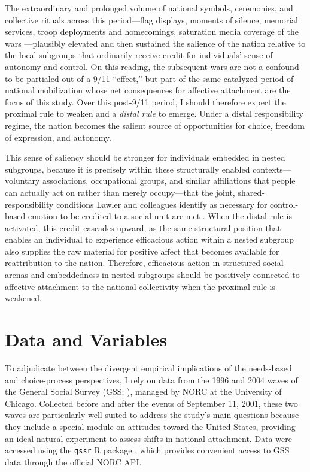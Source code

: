 \documentclass[12pt,letterpaper]{article}
\begin{document}
The extraordinary and prolonged volume of national symbols, ceremonies, and collective rituals across this period---flag displays, moments of silence, memorial services, troop deployments and homecomings, saturation media coverage of the wars \citep{collins2004rituals}---plausibly elevated and then sustained the salience of the nation relative to the local subgroups that ordinarily receive credit for individuals' sense of autonomy and control. On this reading, the subsequent wars are not a confound to be partialed out of a 9/11 ``effect,'' but part of the same catalyzed period of national mobilization whose net consequences for affective attachment are the focus of this study. Over this post-9/11 period, I should therefore expect the proximal rule to weaken and a \textit{distal rule} to emerge. Under a distal responsibility regime, the nation becomes the salient source of opportunities for choice, freedom of expression, and autonomy.

This sense of saliency should be stronger for individuals embedded in nested subgroups, because it is precisely within these structurally enabled contexts---voluntary associations, occupational groups, and similar affiliations that people can actually act on rather than merely occupy---that the joint, shared-responsibility conditions Lawler and colleagues identify as necessary for control-based emotion to be credited to a social unit are met \citep{lawler2006commitment-b3a}. When the distal rule is activated, this credit cascades upward, as the same structural position that enables an individual to experience efficacious action within a nested subgroup also supplies the raw material for positive affect that becomes available for reattribution to the nation. Therefore, efficacious action in structured social arenas and embeddedness in nested subgroups should be positively connected to affective attachment to the national collectivity when the proximal rule is weakened. 

\section{Data and Variables}

To adjudicate between the divergent empirical implications of the needs-based and choice-process perspectives, I rely on data from the 1996 and 2004 waves of the General Social Survey (GSS; \citealp{smith2021general-9ca}), managed by NORC at the University of Chicago. Collected before and after the events of September 11, 2001, these two waves are particularly well suited to address the study's main questions because they include a special module on attitudes toward the United States, providing an ideal natural experiment to assess shifts in national attachment. Data were accessed using the \texttt{gssr} R package \citep{healy2024gssr}, which provides convenient access to GSS data through the official NORC API.
\end{document}
